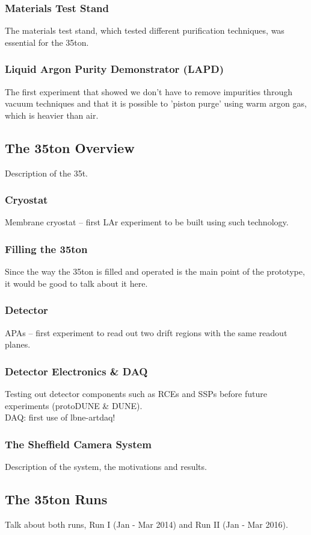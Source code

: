 \documentclass[a4paper,12pt]{report}
\begin{document}
\subsubsection{Materials Test Stand}
The materials test stand, which tested different purification techniques, was essential for the 35ton.
\subsubsection{Liquid Argon Purity Demonstrator (LAPD)}
The first experiment that showed we don't have to remove impurities through vacuum techniques and that it is possible to 'piston purge' using warm argon gas, which is heavier than air.
\subsection{The 35ton Overview}
Description of the 35t.
\subsubsection{Cryostat}
Membrane cryostat -- first LAr experiment to be built using such technology.
\subsubsection{Filling the 35ton}
Since the way the 35ton is filled and operated is the main point of the prototype, it would be good to talk about it here.
\subsubsection{Detector}
APAs -- first experiment to read out two drift regions with the same readout planes.
\subsubsection{Detector Electronics \& DAQ}
Testing out detector components such as RCEs and SSPs before future experiments (protoDUNE \& DUNE).\\
DAQ: first use of lbne-artdaq!
\subsubsection{The Sheffield Camera System}
Description of the system, the motivations and results.
\subsection{The 35ton Runs}
Talk about both runs, Run I (Jan - Mar 2014) and Run II (Jan - Mar 2016).
\end{document}
